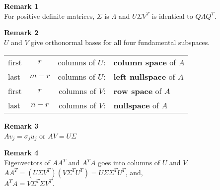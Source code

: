 \textbf{Remark 1}\\
For positive definite matrices, $\Sigma$ is $\Lambda$ and $U\Sigma V^T$ is identical to $Q\Lambda Q^T$.

\vspace{6pt}

\textbf{Remark 2}\\
$U$ and $V$ give orthonormal bases for all four fundamental subspaces. \\
\begin{tabularx}{\linewidth}{lcrX}
first & $r$ & columns of $U$: & \textbf{column space} of $A$\\
last & $m-r$ & columns of $U$: & \textbf{left nullspace} of $A$\\
first & $r$ & columns of $V$: & \textbf{row space} of $A$\\
last & $n-r$ & columns of $V$: & \textbf{nullspace} of $A$\\
\end{tabularx}


\vspace{6pt}

\textbf{Remark 3}\\
$Av_j = \sigma_ju_j$ or $AV = U\Sigma$



\vspace{6pt}

\textbf{Remark 4}\\
Eigenvectors of $AA^T$ and $A^TA$ goes into columns of $U$ and $V$.\\
$AA^T = (U\Sigma V^T)(V\Sigma^T U^T) = U\Sigma\Sigma^T U^T$, and,\\
$A^TA =  V\Sigma^T\Sigma V^T$.\\




\vfill\null
\pagebreak

